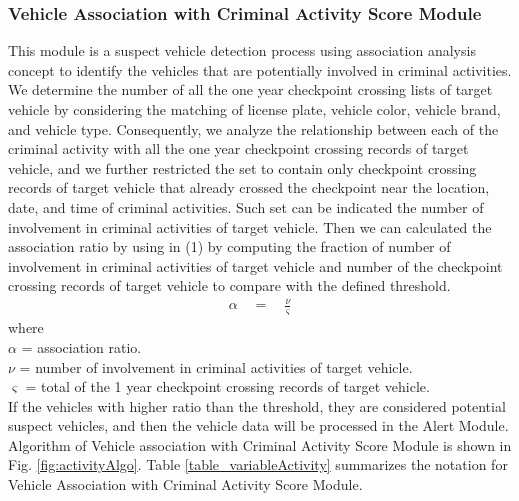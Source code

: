 \documentclass{llncs}
\begin{document}
\subsubsection{Vehicle Association with Criminal Activity Score Module}
This module is a suspect vehicle detection process using association analysis concept to identify the vehicles that are potentially involved in criminal activities. 
We determine the number of all the one year checkpoint crossing lists of target vehicle by considering the matching of license plate, vehicle color, vehicle brand, and vehicle type. 
Consequently, we analyze the relationship between each of the criminal activity with all the one year checkpoint crossing records of target vehicle, and we further restricted the set to contain only checkpoint crossing records of target vehicle that already crossed the checkpoint near the location, date, and time of criminal activities. 
Such set can be indicated the number of involvement in criminal activities of target vehicle. 
Then we can calculated the association ratio by using in (1) by computing the fraction of number of involvement in criminal activities of target vehicle and number of the checkpoint crossing records of target vehicle to compare with the defined threshold.
\begin{eqnarray} 
\alpha \quad =\quad \frac { \nu  }{ \varsigma  }
\end{eqnarray}
where\mbox{ }\\
$\alpha$ = association ratio. \mbox{ }\\
$\nu$ = number of involvement in criminal activities of target vehicle.\mbox{ }\\
$\varsigma$ = total of the 1 year checkpoint crossing records of target vehicle.\\

If the vehicles with higher ratio than the threshold, they are considered potential suspect vehicles, and then the vehicle data will be processed in the Alert Module. 
Algorithm of Vehicle association with Criminal Activity Score Module is shown in Fig. \ref{fig:activityAlgo}. Table \ref{table_variableActivity} summarizes the notation for Vehicle Association with Criminal Activity Score Module.
\end{document}
